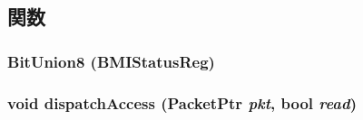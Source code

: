 \subsection{関数}
\hypertarget{classIdeController_a72e04acd6bb1c97077b13a250648674e}{
\subsubsection[{BitUnion8}]{\setlength{\rightskip}{0pt plus 5cm}BitUnion8 (BMIStatusReg)}}
\label{classIdeController_a72e04acd6bb1c97077b13a250648674e}
\hypertarget{classIdeController_ada0391144816c248c9824a65d02e9bad}{
\subsubsection[{dispatchAccess}]{\setlength{\rightskip}{0pt plus 5cm}void dispatchAccess ({\bf PacketPtr} {\em pkt}, \/  bool {\em read})}}
\label{classIdeController_ada0391144816c248c9824a65d02e9bad}



